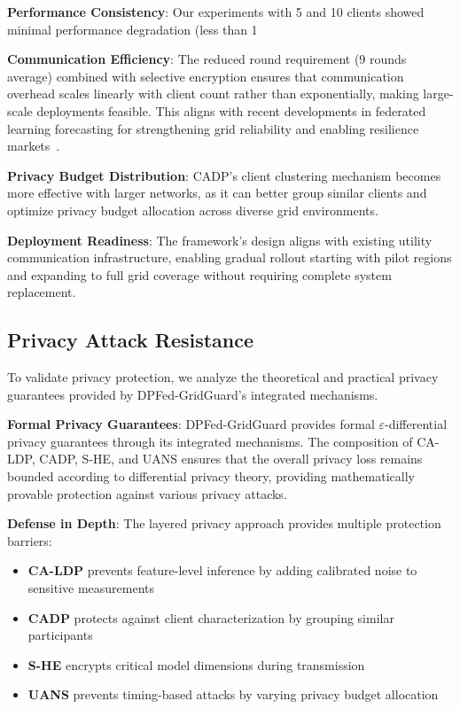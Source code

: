 \documentclass{ieeeaccess}
\theoremstyle{definition}
\begin{document}
\textbf{Performance Consistency}: Our experiments with 5 and 10 clients showed minimal performance degradation (less than 1%

\textbf{Communication Efficiency}: The reduced round requirement (9 rounds average) combined with selective encryption ensures that communication overhead scales linearly with client count rather than exponentially, making large-scale deployments feasible. This aligns with recent developments in federated learning forecasting for strengthening grid reliability and enabling resilience markets~\cite{pereira2024federated}.

\textbf{Privacy Budget Distribution}: CADP's client clustering mechanism becomes more effective with larger networks, as it can better group similar clients and optimize privacy budget allocation across diverse grid environments.

\textbf{Deployment Readiness}: The framework's design aligns with existing utility communication infrastructure, enabling gradual rollout starting with pilot regions and expanding to full grid coverage without requiring complete system replacement.

\subsection{Privacy Attack Resistance}

To validate privacy protection, we analyze the theoretical and practical privacy guarantees provided by DPFed-GridGuard's integrated mechanisms.

\textbf{Formal Privacy Guarantees}: DPFed-GridGuard provides formal $\varepsilon$-differential privacy guarantees through its integrated mechanisms. The composition of CA-LDP, CADP, S-HE, and UANS ensures that the overall privacy loss remains bounded according to differential privacy theory, providing mathematically provable protection against various privacy attacks.

\textbf{Defense in Depth}: The layered privacy approach provides multiple protection barriers:
\begin{itemize}
\item \textbf{CA-LDP} prevents feature-level inference by adding calibrated noise to sensitive measurements
\item \textbf{CADP} protects against client characterization by grouping similar participants
\item \textbf{S-HE} encrypts critical model dimensions during transmission
\item \textbf{UANS} prevents timing-based attacks by varying privacy budget allocation
\end{itemize}
\end{document}
